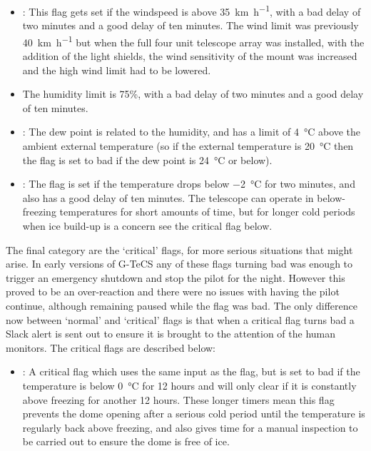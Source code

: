 \begin{colsection}
\begin{colsection}
\begin{itemize}
    \item {}: This flag gets set if the windspeed is above \SI{35}{\kilo\meter\per\hour}, with a bad delay of two minutes and a good delay of ten minutes. The wind limit was previously \SI{40}{\kilo\metre\per\hour} but when the full four unit telescope array was installed, with the addition of the light shields, the wind sensitivity of the mount was increased and the high wind limit had to be lowered.

    \item {} The humidity limit is 75\%, with a bad delay of two minutes and a good delay of ten minutes.

    \item {}: The dew point is related to the humidity, and has a limit of \SI{4}{\celsius} above the ambient external temperature (so if the external temperature is \SI{20}{\celsius} then the flag is set to bad if the dew point is \SI{24}{\celsius} or below).

    \item {}: The  flag is set if the temperature drops below \SI{-2}{\celsius} for two minutes, and also has a good delay of ten minutes. The telescope can operate in below-freezing temperatures for short amounts of time, but for longer cold periods when ice build-up is a concern see the critical  flag below.

\end{itemize}

The final category are the `critical' flags, for more serious situations that might arise. In early versions of G-TeCS any of these flags turning bad was enough to trigger an emergency shutdown and stop the pilot for the night. However this proved to be an over-reaction and there were no issues with having the pilot continue, although remaining paused while the flag was bad. The only difference now between `normal' and `critical' flags is that when a critical flag turns bad a Slack alert is sent out to ensure it is brought to the attention of the human monitors. The critical flags are described below:

\begin{itemize}
    \item {}: A critical flag which uses the same input as the  flag, but is set to bad if the temperature is below \SI{0}{\celsius} for 12 hours and will only clear if it is constantly above freezing for another 12 hours. These longer timers mean this flag prevents the dome opening after a serious cold period until the temperature is regularly back above freezing, and also gives time for a manual inspection to be carried out to ensure the dome is free of ice.


\end{itemize}
\end{colsection}
\end{colsection}
